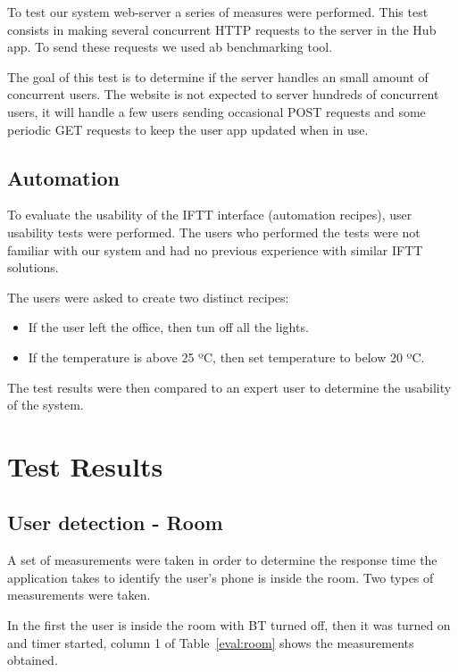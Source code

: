 To test our system web-server a series of measures were performed. This test consists in making several concurrent \ac{HTTP} requests to the server in the Hub app. To send these requests we used \ac{ab} benchmarking tool.

The goal of this test is to determine if the server handles an small amount of concurrent users. The website is not expected to server hundreds of concurrent users, it will handle a few users sending occasional POST requests and some periodic GET requests to keep the user app updated when in use.


\subsection{Automation}

To evaluate the usability of the \ac{IFTT} interface (automation recipes), user usability tests were performed. The users who performed the tests were not familiar with our system and had no previous experience with similar \ac{IFTT} solutions.

The users were asked to create two distinct recipes:

\begin{itemize}
  \item If the user left the office, then tun off all the lights.
  \item If the temperature is above 25 ºC, then set temperature to below 20 ºC. 
\end{itemize} 

The test results were then compared to an expert user to determine the usability of the system.



\section{Test Results}


\subsection{User detection - Room}

A set of measurements were taken in order to determine the response time the application takes to identify the user's phone is inside the room. Two types of measurements were taken.

In the first the user is inside the room with \ac{BT} turned off, then it was turned on and timer started, column 1 of Table~\ref{eval:room} shows the measurements obtained. 

